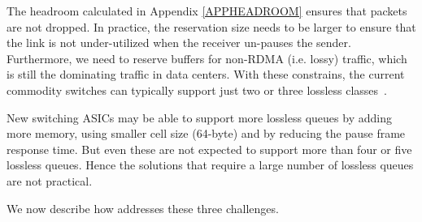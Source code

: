 The headroom calculated in Appendix \ref{APPHEADROOM} ensures that  
packets are not dropped. In practice, the reservation size needs to be larger to 
ensure that the link is not under-utilized when the receiver un-pauses the
sender. Furthermore, we need to reserve buffers for non-RDMA (i.e. lossy) traffic, which is
still the dominating traffic in data centers. With these constrains, the
current commodity switches can typically support just two or three lossless
classes~\cite{rdmaatscale}.

New switching ASICs may be able to support more lossless queues by adding more
memory, using smaller cell size (64-byte) and by reducing the pause frame
response time. But even these are not expected to support more than four or five
lossless queues. Hence the solutions that require a large number of lossless
queues are not practical. 

We now describe how \sysname{} addresses these three challenges. 

